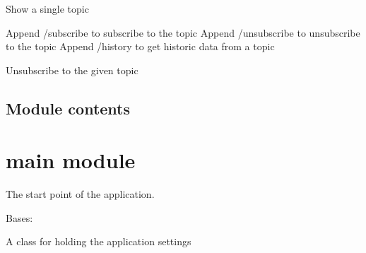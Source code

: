 \documentclass[letterpaper,10pt,english]{sphinxmanual}
\begin{document}

\begin{fulllineitems}
\label{\detokenize{src:src.views.topics_detail}}
Show a single topic

Append /subscribe to subscribe to the topic
Append /unsubscribe to unsubscribe to the topic
Append /history to get historic data from a topic

\end{fulllineitems}


\begin{fulllineitems}
\label{\detokenize{src:src.views.unsubscribe}}
Unsubscribe to the given topic

\end{fulllineitems}



\subsection{Module contents}
\label{\detokenize{src:module-src}}\label{\detokenize{src:module-contents}}

\section{main module}
\label{\detokenize{main:module-main}}\label{\detokenize{main:main-module}}\label{\detokenize{main::doc}}
The start point of the application.

\begin{fulllineitems}
\label{\detokenize{main:main.Settings}}
Bases: 

A class for holding the application settings

\end{fulllineitems}
\end{document}
